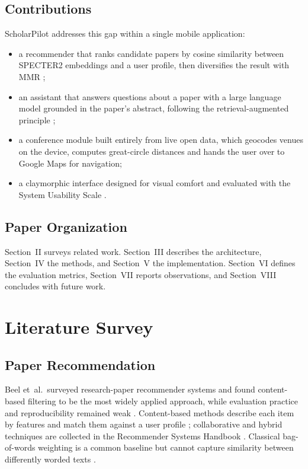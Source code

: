 \documentclass[conference]{IEEEtran}
\begin{document}
\subsection{Contributions}
ScholarPilot addresses this gap within a single mobile application:
\begin{itemize}
    \item a recommender that ranks candidate papers by cosine similarity between SPECTER2 embeddings \cite{cohan2020,singh2023} and a user profile, then diversifies the result with MMR \cite{carbonell1998};
    \item an assistant that answers questions about a paper with a large language model \cite{gemini2023} grounded in the paper's abstract, following the retrieval-augmented principle \cite{lewis2020};
    \item a conference module built entirely from live open data, which geocodes venues on the device, computes great-circle distances \cite{sinnott1984} and hands the user over to Google Maps for navigation;
    \item a claymorphic interface designed for visual comfort \cite{norman2013} and evaluated with the System Usability Scale \cite{brooke1996,bangor2008}.
\end{itemize}

\subsection{Paper Organization}
Section~II surveys related work. Section~III describes the architecture, Section~IV the methods, and Section~V the implementation. Section~VI defines the evaluation metrics, Section~VII reports observations, and Section~VIII concludes with future work.

\section{Literature Survey}
\subsection{Paper Recommendation}
Beel et~al.\ surveyed research-paper recommender systems and found content-based filtering to be the most widely applied approach, while evaluation practice and reproducibility remained weak \cite{beel2016}. Content-based methods describe each item by features and match them against a user profile \cite{lops2011}; collaborative and hybrid techniques are collected in the Recommender Systems Handbook \cite{ricci2015}. Classical bag-of-words weighting is a common baseline but cannot capture similarity between differently worded texts \cite{manning2008}.
\end{document}
